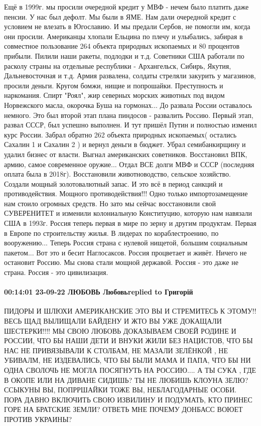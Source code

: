 Ещё в 1999г. мы просили очередной кредит у МВФ - нечем было платить даже пенсии.
У нас был дефолт.
Мы были в ЯМЕ.
Нам дали очередной кредит с условием не влезать в Югославию.
И мы предали Сербов, не помогли им, когда они просили.
Американцы хлопали Ельцина по плечу и улыбались, забирая в совместное пользование 264 объекта природных ископаемых и 80 процентов прибыли. Пилили наши ракеты, подлодки и т.д.
Советники США работали по расколу страны на отдельные республики - Архангельск, Сибирь, Якутия, Дальневосточная и т.д. Армия развалена, солдаты стреляли закурить у магазинов, просили деньги.
Кругом бомжи, нищие и попрошайки. Преступность и наркомания. Спирт "Роял", жир северных морских животных под видом Норвежского масла, окорочка Буша на гормонах...
До развала России оставалось немного.
Это был второй этап плана пиндосов - развалить Россию.
Первый этап, развал СССР, был успешно выполнен.
И тут пришёл Путин и полностью изменил курс России. Забрал обратно 262 объекта природных ископаемых( остались Сахалин 1 и Сахалин 2 ) и вернул деньги в бюджет. Убрал семибанкирщину и удалил бизнес от власти.
Выгнал американских советников.
Восстановил ВПК, армию, самое современное оружие...
Отдал ВСЕ долги МВФ и СССР (последняя оплата была в 2018г). Восстановили животноводство, сельское хозяйство. Создали мощный золотовалютный запас.
И это всё в период санкций и противодействия. Мощного противодействия!!!
Одно только импортозамещение нам стоило огромных средств.
Но зато мы сейчас восстановили свой СУВЕРЕНИТЕТ и изменили колониальную Конституцию, которую нам навязали США в 1993г.
Россия теперь первая в мире по зерну и другим продуктам.
Первая в Европе по строительству жилья.
В лидерах по кораблестроению, по вооружению...
Теперь Россия страна с нулевой нищетой, большим социальным пакетом...
Вот это и бесит Наглосаксов.
Россия процветает и живёт.
Ничего не остановит Россию.
Мы снова стали мощной державой.
Россия - это даже не страна.
Россия - это цивилизация.

\paragraph{00:14:01 23-09-22 ЛЮБОВЬ Любовьreplied to Григорій}

ПИДОРЫ И ШЛЮХИ АМЕРИКАНСКИЕ ЭТО ВЫ И СТРЕМИТЕСЬ К ЭТОМУ!! ВЕСЬ ЩАД ВЫЛИЩАЛИ
БАЙДЕНУ И ЖТО ВЫ УЖЕ ДОКАЩАЛИ ШЕСТЕРКИ!!!! МЫ СВОЮ ЛЮБОВЬ ДОКАЗЫВАЕМ СВОЕЙ
РОДИНЕ И РОССИИ, ЧТО БЫ НАШИ ДЕТИ И ВНУКИ ЖИЛИ БЕЗ НАЦИСТОВ, ЧТО БЫ НАС НЕ
ПРИВЯЗЫВАЛИ К СТОЛБАМ, НЕ МАЗАЛИ ЗЕЛЁНКОЙ , НЕ УБИВАЛМ, НЕ ИЗДЕВАЛИСЬ, ЧТО БЫ
БЫЛИ МАМА И ПАПА, ЧТО БЫ НИ ОДНА СВОЛОЧЬ НЕ МОГЛА ПОСЯГНУТЬ НА РОССИЮ.... А ТЫ
СУКА , ГДЕ В ОКОПЕ ИЛИ НА ДИВАНЕ СИДИШЬ? ТЫ НЕ ЛЮБИШЬ КЛОУНА ЗЕЛЮ? ССЫКУНЫ ВЫ,
ПОПРРШАЙКИ ТОЖЕ ВЫ, НЕБЛАГОДАРНЫЕ ОСОБИ. ПОРА ДАВНО ВКЛЮЧИТЬ СВОЮ ИЗВИЛИНУ И
ПОДУМАТЬ, КТО ПРИНЕС ГОРЕ НА БРАТСКИЕ ЗЕМЛИ? ОТВЕТЬ МНЕ ПОЧЕМУ ДОНБАСС ВОЮЕТ
ПРОТИВ УКРАИНЫ?

